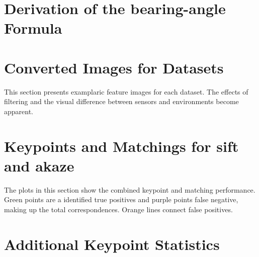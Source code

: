 \documentclass[numbers=noenddot,doktyp=marbeit,fontsize=12pt,sprache=english,hausschrift=true,draft=false]{TUBAFarbeiten}
\begin{document}
\begin{appendix}
    \renewcommand*{\thepage}{\thesection\arabic{page}}
    \renewcommand{\thetable}{\thesection\arabic{table}}
    \renewcommand{\thefigure}{\thesection\arabic{figure}}

    \newpage

    \section{Derivation of the \Gls{bearing-angle} Formula}\label{sec:bearing_derivation}
    
    \newpage

    \section{Converted Images for Datasets}

    This section presents examplaric feature images for each dataset.
    The effects of filtering and the visual difference between sensors and environments become apparent.
    {\setlength{\abovecaptionskip}{-20pt}%
     \setlength{\belowcaptionskip}{-30pt}%
     \setlength{\floatsep}{1pt plus 1pt minus 1pt}%
     \setlength{\textfloatsep}{1pt plus 1.0pt minus 2.0pt}
     \setlength{\intextsep}{1pt plus 1.0pt minus 2.0pt}
    
    
    
    
    }
    \newpage

    \section{Keypoints and Matchings for \acrshort{sift} and \acrshort{akaze}}
    The plots in this section show the combined keypoint and matching performance.
    Green points are a identified true positives and purple points false negative, making up the total correspondences.
    Orange lines connect false positives.
    
    
    \newpage

    \section{Additional Keypoint Statistics}
    
    
    
    
    \newpage
\end{appendix}



\end{document}
